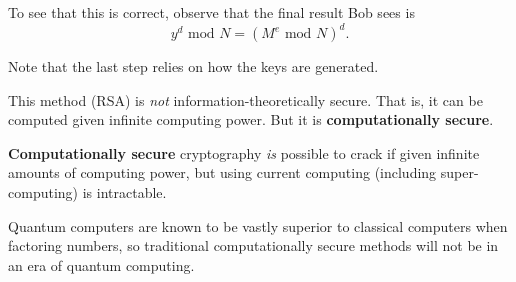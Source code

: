 \documentclass[titlepage, 12pt, leqno]{article}
\begin{document}
To see that this is correct, observe that the final result Bob sees is 
\[
    y^{d} \text{ mod } N = (M^{e} \text{ mod } N)^{d}.
\]
\begin{note}
    Note that the last step relies on how the keys are generated.
\end{note}

This method (RSA) is \textit{not} information-theoretically secure. That is, it
can be computed given infinite computing power. But it is \textbf{computationally
secure}.

\begin{definition}
    \textbf{Computationally secure} cryptography \textit{is} possible to crack if
    given infinite amounts of computing power, but using current computing 
    (including super-computing) is intractable.

    \begin{note}
        Quantum computers are known to be vastly superior to classical computers
        when factoring numbers, so traditional computationally secure methods will
        not be in an era of quantum computing.
    \end{note}
\end{definition}
\end{document}
